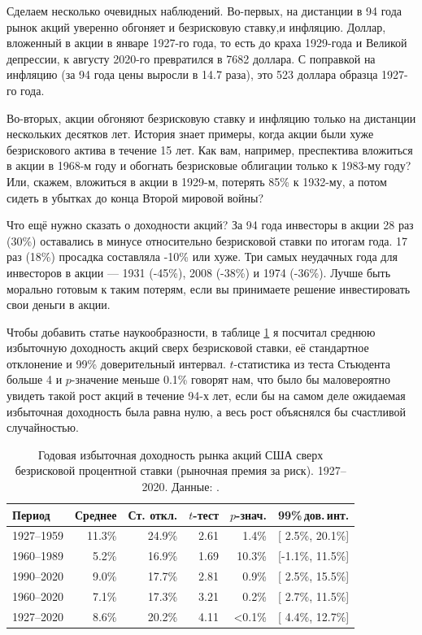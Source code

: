 Сделаем несколько очевидных наблюдений. Во-первых, на дистанции в 94 года рынок акций уверенно обгоняет и безрисковую ставку,и инфляцию. Доллар, вложенный в акции в январе 1927-го года, то есть до краха 1929-года и Великой депрессии, к августу 2020-го превратился в 7682 доллара. С поправкой на инфляцию (за 94 года цены выросли в 14.7 раза), это 523 доллара образца 1927-го года.

Во-вторых, акции обгоняют безрисковую ставку и инфляцию только на дистанции нескольких десятков лет. История знает примеры, когда акции были хуже безрискового актива в течение 15 лет. Как вам, например, преспектива вложиться в акции в 1968-м году и обогнать безрисковые облигации только к 1983-му году? Или, скажем, вложиться в акции в 1929-м, потерять 85\% к 1932-му, а потом сидеть в убытках до конца Второй мировой войны?

Что ещё нужно сказать о доходности акций? За 94 года инвесторы в акции 28 раз (30\%) оставались в минусе относительно безрисковой ставки по итогам года. 17 раз (18\%) просадка составляла -10\% или хуже. Три самых неудачных года для инвесторов в акции --- 1931 (-45\%), 2008 (-38\%) и 1974 (-36\%). Лучше быть морально готовым к таким потерям, если вы принимаете решение инвестировать свои деньги в акции.

Чтобы добавить статье наукообразности, в таблице \ref{us_market_risk_premium} я посчитал среднюю избыточную доходность акций сверх безрисковой ставки, её стандартное отклонение и 99\% доверительный интервал. $t$-статистика из теста Стьюдента больше 4 и $p$-значение меньше 0.1\% говорят нам, что было бы маловероятно увидеть такой рост акций в течение 94-х лет, если бы на самом деле ожидаемая избыточная доходность была равна нулю, а весь рост объяснялся бы счастливой случайностью.

\begin{table}[h]
\centering
\begin{tabular}{l|r|r|r|r|c}
Период & Среднее & Ст. откл. & $t$-тест & $p$-знач. & 99\%\,дов.\,инт. \\
\hline
1927--1959 & 11.3\% & 24.9\% & 2.61 &  1.4\% & [ 2.5\%, 20.1\%] \\ 
1960--1989 &  5.2\% & 16.9\% & 1.69 & 10.3\% & [-1.1\%, 11.5\%] \\
1990--2020 &  9.0\% & 17.7\% & 2.81 &  0.9\% & [ 2.5\%, 15.5\%] \\
1960--2020 &  7.1\% & 17.3\% & 3.21 &  0.2\% & [ 2.7\%, 11.5\%] \\ \hline
1927--2020 &  8.6\% & 20.2\% & 4.11 & <0.1\% & [ 4.4\%, 12.7\%] 
\end{tabular}
\caption{Годовая избыточная доходность рынка акций США сверх безрисковой процентной ставки (рыночная премия за риск). 1927--2020. Данные: \cite{kennethFrench}.}
\label{us_market_risk_premium}
\end{table}

